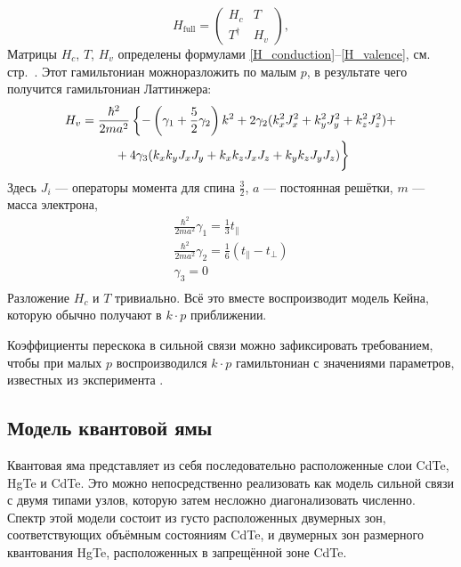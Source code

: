 \begin{equation}
    \label{hfull}
    H_{\mathrm{full}} = \begin{pmatrix}
                            H_c & T \\
                            T^\dagger & H_v
                        \end{pmatrix},
\end{equation}
Матрицы $H_c$, $T$, $H_v$ определены формулами \eqref{H_conduction}--\eqref{H_valence}, см.
стр.~\pageref{H_conduction}.
Этот гамильтониан можноразложить по малым $p$,
в результате чего получится гамильтониан Латтинжера:
\begin{multline}
    H_v = \frac{\hbar^2}{2ma^2}\left\{-\left(\gamma_1 + \frac{5}{2}\gamma_2\right) k^2 + 
        2\gamma_2(k_x^2J_x^2 + k_y^2J_y^2 + k_z^2J_z^2) + \right. \\
        \left.\vphantom{\left(\frac{1}{2}\right)} 
            +4\gamma_3(k_x k_y J_x J_y + k_x k_z J_x J_z + k_y k_z J_y J_z) \right\}
\end{multline}
Здесь $J_i$ --- операторы момента для спина $\frac{3}{2}$, $a$ --- постоянная решётки,
$m$ --- масса электрона,
\begin{equation}
    \begin{gathered}
        \frac{\hbar^2}{2ma^2}\gamma_1 = \frac13 t_\parallel\\
        \frac{\hbar^2}{2ma^2}\gamma_2 = \frac16(t_\parallel - t_\perp)\\
        \gamma_3 = 0\\
    \end{gathered}
\end{equation}
Разложение $H_c$ и $T$ тривиально.
Всё это вместе воспроизводит модель Кейна, которую обычно получают в $k \cdot p$ приближении.

Коэффициенты перескока в сильной связи можно зафиксировать требованием, чтобы при малых $p$ 
воспроизводился $k\cdot p$ гамильтониан с значениями параметров, известных из эксперимента
\cite{Novik2005}. 


\subsection{Модель квантовой ямы}
Квантовая яма представляет из себя последовательно расположенные слои CdTe, HgTe и CdTe.
Это можно непосредственно реализовать как модель сильной связи с двумя типами узлов, которую
затем несложно диагонализовать численно. Спектр этой модели состоит из густо расположенных
двумерных зон, соответствующих объёмным состояниям CdTe, и двумерных зон размерного квантования
HgTe, расположенных в запрещённой зоне CdTe.

